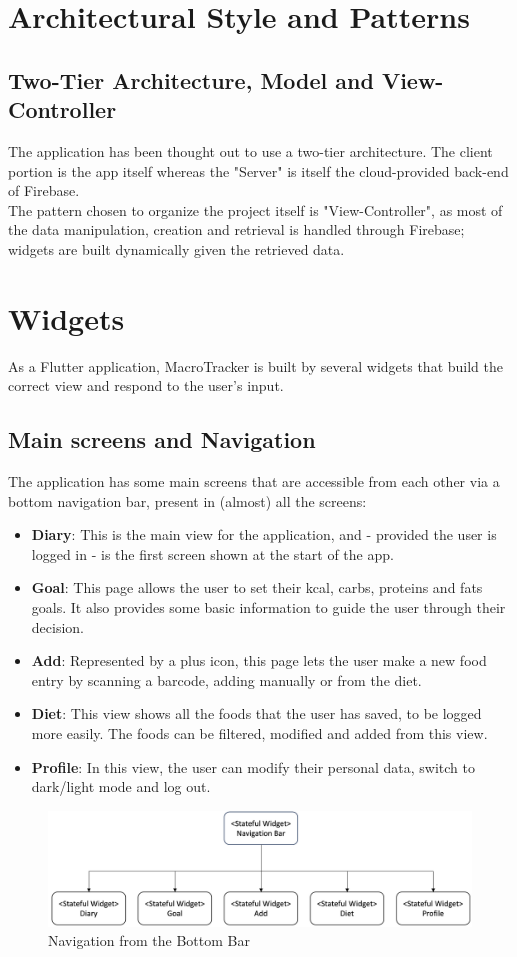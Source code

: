 \documentclass{Configuration_Files/PoliMi3i_thesis}
\begin{document}
\section{Architectural Style and Patterns}
\subsection{Two-Tier Architecture, Model and View-Controller}
The application has been thought out to use a two-tier architecture. The client portion is the app itself whereas the "Server" is itself the cloud-provided back-end of Firebase. \\
The pattern chosen to organize the project itself is "View-Controller", as most of the data manipulation, creation and retrieval is handled through Firebase; widgets are built dynamically given the retrieved data.
\section{Widgets}
As a Flutter application, MacroTracker is built by several widgets that build the correct view and respond to the user's input. 
\subsection{Main screens and Navigation}
The application has some main screens that are accessible from each other via a bottom navigation bar, present in (almost) all the screens:
\begin{itemize}
    \item \textbf{Diary}: This is the main view for the application, and - provided the user is logged in - is the first screen shown at the start of the app.
    \item \textbf{Goal}: This page allows the user to set their kcal, carbs, proteins and fats goals. It also provides some basic information to guide the user through their decision. 
    \item \textbf{Add}: Represented by a plus icon, this page lets the user make a new food entry by scanning a barcode, adding manually or from the diet. 
    \item \textbf{Diet}: This view shows all the foods that the user has saved, to be logged more easily. The foods can be filtered, modified and added from this view.
    \item \textbf{Profile}: In this view, the user can modify their personal data, switch to dark/light mode and log out. 
\end{itemize}
\begin{figure}[H]
  \centering
  \includegraphics[scale=0.2]{Images/Navigation.png}
  \caption{Navigation from the Bottom Bar}
\end{figure}
\end{document}
